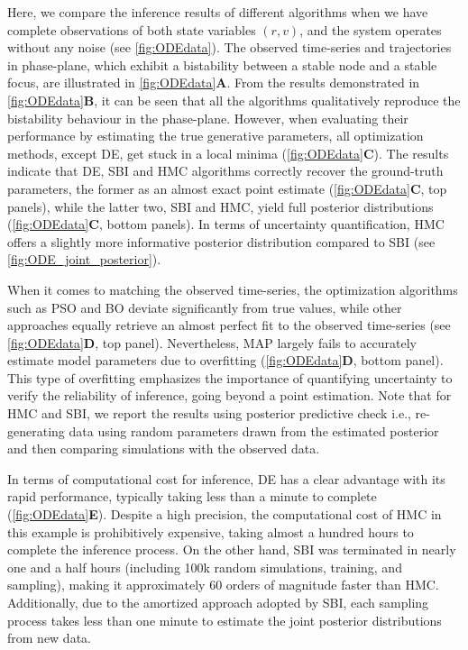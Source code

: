\documentclass[preprint,11pt,authoryear]{elsarticle}
\begin{document}
Here, we compare the inference results of different algorithms when we have complete observations of both state variables $(r,v)$, and the system operates without any noise (see \autoref{fig:ODEdata}). The observed time-series and trajectories in phase-plane, which exhibit a bistability between a stable node and a stable focus, are illustrated in \autoref{fig:ODEdata}\textbf{A}. From the results demonstrated in \autoref{fig:ODEdata}\textbf{B}, it can be seen that all the algorithms qualitatively reproduce the bistability behaviour in the phase-plane. However, when evaluating their performance by estimating the true generative parameters, all optimization methods, except DE, get stuck in a local minima (\autoref{fig:ODEdata}\textbf{C}). The results indicate that DE, SBI and HMC algorithms correctly recover the ground-truth parameters, the former as an almost exact point estimate (\autoref{fig:ODEdata}\textbf{C}, top panels), while the latter two, SBI and HMC, yield full posterior distributions (\autoref{fig:ODEdata}\textbf{C}, bottom panels).  In terms of uncertainty quantification, HMC offers a slightly more informative posterior distribution compared to SBI (see \autoref{fig:ODE_joint_posterior}).

When it comes to matching the observed time-series, the optimization algorithms such as PSO and BO deviate significantly from true values, while other approaches equally retrieve an almost perfect fit to the observed time-series (see \autoref{fig:ODEdata}\textbf{D}, top panel). Nevertheless, MAP largely fails to accurately estimate model parameters due to overfitting (\autoref{fig:ODEdata}\textbf{D}, bottom panel). This type of overfitting emphasizes the importance of quantifying uncertainty to verify the reliability of inference, going beyond a point estimation. Note that for HMC and SBI, we report the results using posterior predictive check i.e., re-generating data using random parameters drawn from the estimated posterior and then comparing simulations with the observed data.

In terms of computational cost for inference, DE has a clear advantage with its rapid performance, typically taking less than a minute to complete (\autoref{fig:ODEdata}\textbf{E}). Despite a high precision, the computational cost of HMC in this example is prohibitively expensive, taking almost a hundred hours to complete the inference process. On the other hand, SBI was terminated in nearly one and a half hours (including 100k random simulations, training, and sampling), making it approximately 60 orders of magnitude faster than HMC. Additionally, due to the amortized approach adopted by SBI, each sampling process takes less than one minute to estimate the joint posterior distributions from new data. 
\end{document}

